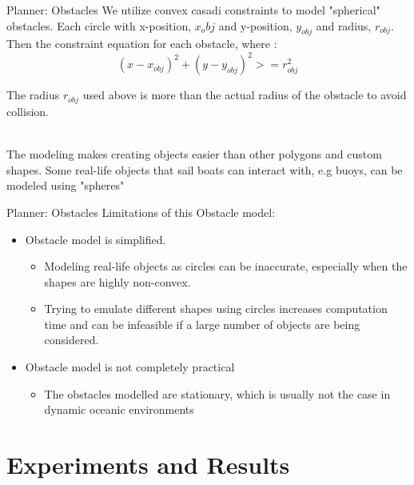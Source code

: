 \documentclass[10pt,xcolor={table,dvipsnames},t]{beamer}
\begin{document}
\begin{frame}{Planner: Obstacles}
We utilize convex casadi constraints to model "spherical" obstacles. Each circle with x-position, \(x_obj\) and y-position, \(y_{obj}\) and radius, \(r_{obj}\). Then the constraint equation for each obstacle, where : 
\begin{equation}
        (x - x_{obj})^2 + (y-y_{obj})^2 >= r_{obj}^2
    \end{equation}
    
The radius \(r_{obj}\) used above is more than the actual radius of the obstacle to avoid collision.

    \hfill\\
The modeling makes creating objects easier than other polygons and custom shapes. Some real-life objects that sail boats can interact with, e.g buoys, can be modeled using "spheres"
\end{frame}

\begin{frame}{Planner: Obstacles}
Limitations of this Obstacle model: 
\begin{itemize}
        \item Obstacle model is simplified.
            \begin{itemize}
                \item Modeling real-life objects as circles can be inaccurate, especially when the shapes are highly non-convex.
                
                \item Trying to emulate different shapes using circles increases computation time and can be infeasible if a large number of objects are being considered.
                \end{itemize}
\end{itemize}
\begin{itemize}
        \item Obstacle model is not completely practical
            \begin{itemize}
                \item The obstacles modelled are stationary, which is usually not the case in dynamic oceanic environments
                \end{itemize}
\end{itemize}
\end{frame}

\section{Experiments and Results}
\end{document}
